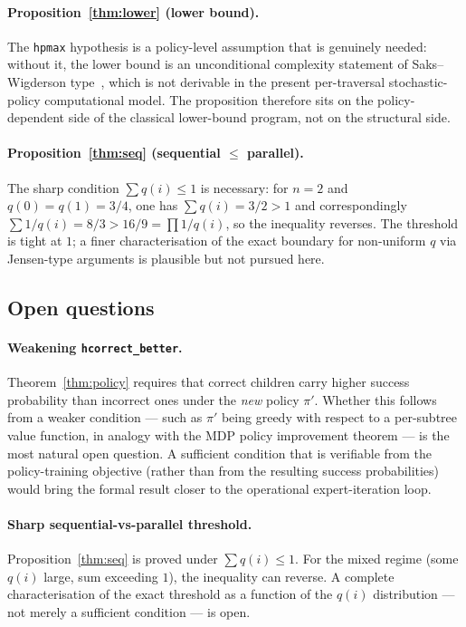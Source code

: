 \documentclass[reqno,11pt]{amsart}
\theoremstyle{plain}
\theoremstyle{definition}
\theoremstyle{remark}
\begin{document}
\paragraph{Proposition~\ref{thm:lower} (lower bound).} The \texttt{hpmax} hypothesis is a policy-level assumption that is genuinely needed: without it, the lower bound is an unconditional complexity statement of Saks--Wigderson type~\citep{SaksWigderson1986,Snir1985}, which is not derivable in the present per-traversal stochastic-policy computational model. The proposition therefore sits on the policy-dependent side of the classical lower-bound program, not on the structural side.

\paragraph{Proposition~\ref{thm:seq} (sequential $\le$ parallel).} The sharp condition $\sum q(i) \le 1$ is necessary: for $n = 2$ and $q(0) = q(1) = 3/4$, one has $\sum q(i) = 3/2 > 1$ and correspondingly $\sum 1/q(i) = 8/3 > 16/9 = \prod 1/q(i)$, so the inequality reverses. The threshold is tight at $1$; a finer characterisation of the exact boundary for non-uniform $q$ via Jensen-type arguments is plausible but not pursued here.

\subsection{Open questions}

\paragraph{Weakening \texttt{hcorrect\_better}.} Theorem~\ref{thm:policy} requires that correct children carry higher success probability than incorrect ones under the \emph{new} policy $\pi'$. Whether this follows from a weaker condition --- such as $\pi'$ being greedy with respect to a per-subtree value function, in analogy with the MDP policy improvement theorem --- is the most natural open question. A sufficient condition that is verifiable from the policy-training objective (rather than from the resulting success probabilities) would bring the formal result closer to the operational expert-iteration loop.

\paragraph{Sharp sequential-vs-parallel threshold.} Proposition~\ref{thm:seq} is proved under $\sum q(i) \le 1$. For the mixed regime (some $q(i)$ large, sum exceeding $1$), the inequality can reverse. A complete characterisation of the exact threshold as a function of the $q(i)$ distribution --- not merely a sufficient condition --- is open.
\end{document}

